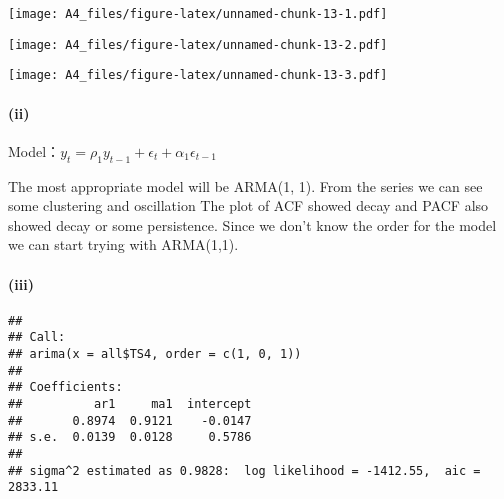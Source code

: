 \documentclass[]{article}
\newenvironment{Shaded}{\begin{snugshade}}{\end{snugshade}}
\newcommand{\DataTypeTok}[1]{\textcolor[rgb]{0.13,0.29,0.53}{#1}}
\newcommand{\DecValTok}[1]{\textcolor[rgb]{0.00,0.00,0.81}{#1}}
\newcommand{\KeywordTok}[1]{\textcolor[rgb]{0.13,0.29,0.53}{\textbf{#1}}}
\newcommand{\NormalTok}[1]{#1}
\newcommand{\OperatorTok}[1]{\textcolor[rgb]{0.81,0.36,0.00}{\textbf{#1}}}
\newcommand{\StringTok}[1]{\textcolor[rgb]{0.31,0.60,0.02}{#1}}
\let\oldparagraph\paragraph
\renewcommand{\paragraph}[1]{\oldparagraph{#1}\mbox{}}
\begin{document}
\texttt{[image: A4\_files/figure-latex/unnamed-chunk-13-1.pdf]}

\begin{Shaded}
\end{Shaded}

\texttt{[image: A4\_files/figure-latex/unnamed-chunk-13-2.pdf]}

\begin{Shaded}
\end{Shaded}

\texttt{[image: A4\_files/figure-latex/unnamed-chunk-13-3.pdf]}

\hypertarget{ii-3}{%
\paragraph{(ii)}\label{ii-3}}

Model：\(y_t = \rho_1y_{t-1} + \epsilon_t+ \alpha_1\epsilon_{t-1}\)

The most appropriate model will be ARMA(1, 1). From the series we can
see some clustering and oscillation The plot of ACF showed decay and
PACF also showed decay or some persistence. Since we don't know the
order for the model we can start trying with ARMA(1,1).

\hypertarget{iii-3}{%
\paragraph{(iii)}\label{iii-3}}

\begin{Shaded}
\end{Shaded}

\begin{verbatim}
## 
## Call:
## arima(x = all$TS4, order = c(1, 0, 1))
## 
## Coefficients:
##          ar1     ma1  intercept
##       0.8974  0.9121    -0.0147
## s.e.  0.0139  0.0128     0.5786
## 
## sigma^2 estimated as 0.9828:  log likelihood = -1412.55,  aic = 2833.11
\end{verbatim}
\end{document}
